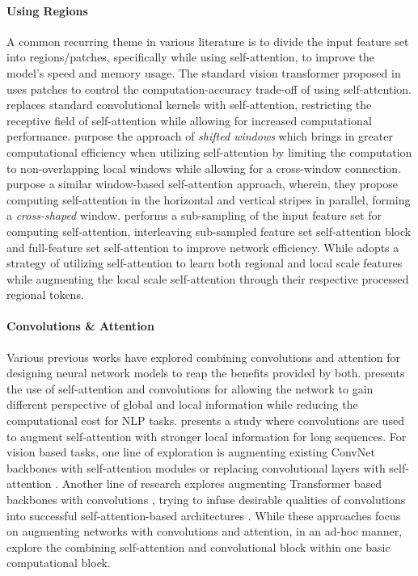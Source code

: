 \documentclass{article}
\begin{document}
\paragraph{Using Regions}
A common recurring theme in various literature \cite{ViT, DBLP:journals/corr/halonet, DBLP:journals/corr/Twins, DBLP:journals/corr/standalone-atten, DBLP:journals/corr/Swin, DBLP:journals/corr/CSwin, chen2022regionvit} is to divide the input feature set into regions/patches, specifically while using self-attention, to improve the model's speed and memory usage. The standard vision transformer proposed in \cite{ViT} uses patches to control the computation-accuracy trade-off of using self-attention. \cite{DBLP:journals/corr/standalone-atten} replaces standard convolutional kernels with self-attention, restricting the receptive field of self-attention while allowing for increased computational performance. \cite{DBLP:journals/corr/Swin} purpose the approach of \textit{shifted windows} which brings in greater computational efficiency when utilizing self-attention by limiting the computation to non-overlapping local windows while allowing for a cross-window connection. \cite{DBLP:journals/corr/CSwin} purpose a similar window-based self-attention approach, wherein, they propose computing self-attention in the horizontal and vertical stripes in parallel, forming a \textit{cross-shaped} window. \cite{DBLP:journals/corr/Twins} performs a sub-sampling of the input feature set for computing self-attention, interleaving sub-sampled feature set self-attention block and full-feature set self-attention to improve network efficiency. 
While \cite{chen2022regionvit} adopts a strategy of utilizing self-attention to learn both regional and local scale features while augmenting the local scale self-attention through their respective processed regional tokens.
\paragraph{Convolutions \& Attention} Various previous works have explored combining convolutions and attention for designing neural network models to reap the benefits provided by both. \cite{2020Lite} presents the use of self-attention and convolutions for allowing the network to gain different perspective of global and local information while reducing the computational cost for NLP tasks. \cite{muse} presents a study where convolutions are used to augment self-attention with stronger local information for long sequences. For vision based tasks, one line of exploration is augmenting existing ConvNet backbones with self-attention modules \cite{DBLP:journals/corr/botnet, DBLP:journals/corr/attenAugConv} or replacing convolutional layers with self-attention \cite{DBLP:journals/corr/halonet, DBLP:journals/corr/standalone-atten}. Another line of research explores augmenting Transformer based backbones with convolutions \cite{DBLP:journals/corr/CvT, DBLP:journals/corr/T2T}, trying to infuse desirable qualities of convolutions into successful self-attention-based architectures \cite{ViT}. While these approaches focus on augmenting networks with convolutions and attention, in an ad-hoc manner, \cite{DBLP:journals/corr/CoAtNet} explore the combining self-attention and convolutional block within one basic computational block.
\end{document}
